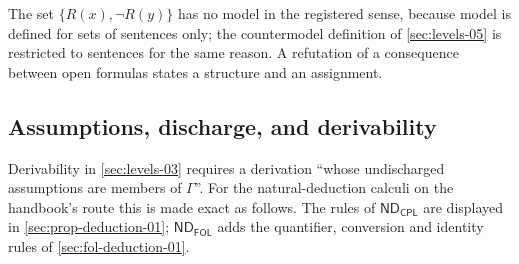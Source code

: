 The set \(\{R(x),\neg R(y)\}\) has no model in the registered sense, because
model is defined for sets of sentences only; the countermodel definition of
\cref{sec:levels-05} is restricted to sentences for the same reason. A
refutation of a consequence between open formulas states a structure and an
assignment.

\subsection{Assumptions, discharge, and derivability}
\label{sec:p01-w02-p01-016-assumptions}

Derivability in \cref{sec:levels-03} requires a derivation ``whose
undischarged assumptions are members of \(\Gamma\)''. For the
natural-deduction calculi on the handbook's route this is made exact as
follows. The rules of \(\mathsf{ND}_{\mathsf{CPL}}\) are displayed in
\cref{sec:prop-deduction-01}; \(\mathsf{ND}_{\mathsf{FOL}}\) adds the
quantifier, conversion and identity rules of \cref{sec:fol-deduction-01}.

